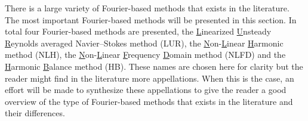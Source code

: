 

There is a large variety of Fourier-based methods that exists in the
literature. 
The most important Fourier-based methods will be presented in this section.
In total four Fourier-based methods are presented, 
the \underline{L}inearized \underline{U}nsteady 
\underline{R}eynolds averaged
Navier--Stokes method (LUR), 
the \underline{N}on-\underline{L}inear 
\underline{H}armonic method (NLH), the \underline{N}on-\underline{L}inear 
\underline{F}requency \underline{D}omain
method (NLFD) and the \underline{H}armonic \underline{B}alance 
method (HB).
These names are chosen here
for clarity but the reader might find in the literature more
appellations. When this is the case, an effort will be made to synthesize
these appellations to give the reader a good 
overview of the type of Fourier-based methods that exists in the literature
and their differences.

